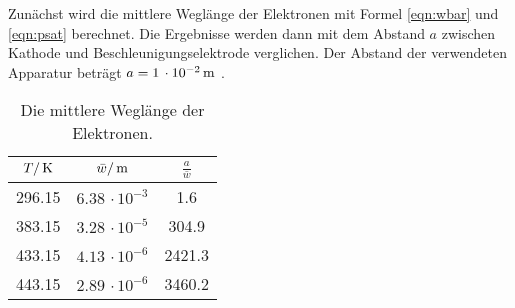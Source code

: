 Zunächst wird die mittlere Weglänge der Elektronen mit Formel \eqref{eqn:wbar}
und \eqref{eqn:psat} berechnet. Die Ergebnisse werden dann mit dem Abstand $a$
zwischen Kathode und Beschleunigungselektrode verglichen. Der Abstand der
verwendeten Apparatur beträgt $a=1\,\cdot10^{-2}\,\si{\meter}$ \cite{601}.
\begin{table}
  \centering
  \begin{tabular}{ccc}
    \toprule
    $T/\,\si{\kelvin}$ & $\bar w/\,\si{\meter}$ & $\frac{a}{\bar w}$ \\
    \midrule
     296.15 & $6.38\,\cdot 10^{-3}$ &    1.6  \\
     383.15 & $3.28\,\cdot 10^{-5}$ &  304.9  \\
     433.15 & $4.13\,\cdot 10^{-6}$ & 2421.3  \\
     443.15 & $2.89\,\cdot 10^{-6}$ & 3460.2  \\
    \bottomrule
  \end{tabular}
  \caption{Die mittlere Weglänge der Elektronen.}
  \label{tab:weg}
\end{table}

